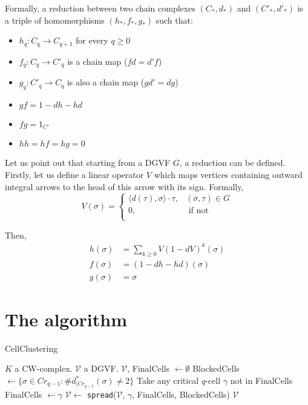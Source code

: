 \documentclass[10pt,a4paper]{report}
\begin{document}
Formally, a reduction between two chain complexes $(C_*, d_*)$ and $(C'_*, d'_*)$ is a triple of homomorphisms $(h_*, f_*, g_*)$ such that:
 \begin{itemize}
 \item $h_q : C_q \rightarrow C_{q+1}$ for every $q \geq 0$
 \item $f_q : C_q \rightarrow C'_q$ is a chain map ($f d = d' f$)
 \item $g_q : C'_q \rightarrow C_q$ is also a chain map ($g d' = d g$)
 \item $g f = 1 - d h - h d$
 \item $f g = 1_{C'}$
 \item $h h = h f = h g = 0$
 \end{itemize}

Let us point out that starting from a DGVF $G$, a reduction can be defined. Firstly, let us define a linear operator $V$ which maps vertices containing outward integral arrows to the head of this arrow with its sign. Formally,
  $$
  V(\sigma) = 
  \begin{cases}
  \langle d(\tau), \sigma \rangle \cdot \tau, & ( \sigma,  \tau ) \in G\\
  0, & \text{ if not}\\
  \end{cases}
  $$

\noindent Then, 
   \begin{align*}
   h(\sigma) &= \sum_{k \geq 0} V(1-dV)^{k}(\sigma) \\
   f(\sigma) &= (1 - d h - h d)(\sigma) \\
   g(\sigma) &= \sigma
   \end{align*}

\section{The algorithm}
\begin{algorithm}[h]
\caption{CellClustering}
\begin{algorithmic}[1]
\REQUIRE $K$ a CW-complex.
\ENSURE $\mathcal{V}$ a DGVF.
\STATE $\mathcal{V}$, FinalCells $\gets \emptyset$
	\STATE BlockedCells $\gets \lbrace \sigma \in Cr_{q-1} : \# d^{*}_{|Cr_{q-1}}(\sigma) \neq 2 \rbrace$
	\REPEAT
		\STATE Take any critical $q$-cell $\gamma$ not in FinalCells
		\STATE FinalCells $\gets \gamma$
		\STATE $\mathcal{V} \gets$ \texttt{spread}($\mathcal{V}$, $\gamma$, FinalCells, BlockedCells)
\ENDFOR
\RETURN $\mathcal{V}$
\end{algorithmic}
\end{algorithm}
\end{document}
